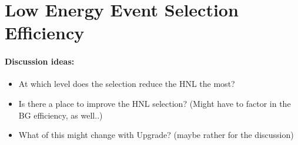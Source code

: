 \section{Low Energy Event Selection Efficiency}


\paragraph{Discussion ideas:}
\begin{itemize}
    \item At which level does the selection reduce the HNL the most?
    \item Is there a place to improve the HNL selection? (Might have to factor in the BG efficiency, as well..)
    \item What of this might change with Upgrade? (maybe rather for the discussion)
\end{itemize}
